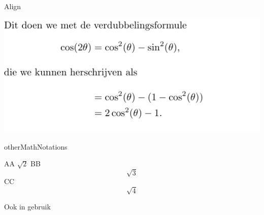 \documentclass[presentatie.tex]{subfiles}
\begin{document}

\begin{frame}{Align}

	\centering\includegraphics[width=\linewidth,height=0.4\textheight,keepaspectratio]{assets/5_Formules/mathAlignIntertext.pdf}
\end{frame}

\begin{saveblock}{otherMathNotations}
	\begin{highlightblock}[gobble=8,linewidth=0.5\textwidth,
		framexleftmargin=0.25em,xleftmargin=0.25em]
		AA \(\sqrt{2}\)
		BB \[\sqrt{3}\]
		CC $$ \sqrt{4} $$
	\end{highlightblock}
\end{saveblock}

\addtorecentlist{\textbackslash [ \textellipsis\textbackslash]}

\begin{frame}{Ook in gebruik}
	\begin{columns}
		\begin{column}{0.5\textwidth}
		\end{column}
		\begin{column}{0.5\textwidth}
		\end{column}
	\end{columns}


\end{frame}
\end{document}
